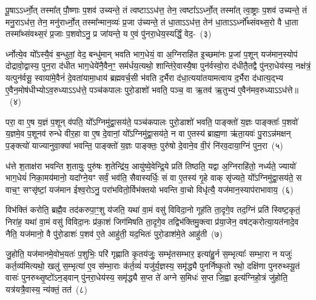 पू॒षा\-ऽ\-ऽर्ध्नो॒त् तस्मा᳚त् पौ॒ष्णाः प॒शव॑ उच्यन्ते॒ तं त्वष्टा\-ऽ\-ऽध॑त्त॒ तेन॒ त्वष्टा᳚\-ऽ\-ऽर्ध्नो॒त् तस्मा᳚त् त्वा॒ष्ट्राः प॒शव॑ उच्यन्ते॒ तं मनु॒रा\-ऽध॑त्त॒ तेन॒ मनु॑रार्ध्नो॒त् तस्मा᳚न्मान॒व्यः॑ प्र॒जा उ॑च्यन्ते॒ तं धा॒ता\-ऽ\-ऽध॑त्त॒ तेन॑ धा॒ता\-ऽ\-ऽर्ध्नो᳚थ्संवथ्स॒रो वै धा॒ता तस्मा᳚थ्संवथ्स॒रं प्र॒जाः प॒शवो\-ऽनु॒ प्र जा॑यन्ते॒ य ए॒वं पु॑नरा॒धेय॒स्यर्द्धिं॒ वेद॒-~(३)

र्ध्नोत्ये॒व यो᳚\-ऽस्यै॒वं ब॒न्धुतां॒ वेद॒ बन्धु॑मान् भवति भाग॒धेयं॒ वा अ॒ग्निराहि॑त इ॒च्छमा॑नः प्र॒जां प॒शून् यज॑मान॒स्योप॑ दोद्रावो॒द्वास्य॒ पुन॒रा द॑धीत भाग॒धेये॑नै॒वैन॒ꣳ॒ सम॑र्धय॒त्यथो॒ शान्ति॑रे॒वास्यै॒षा पुन॑र्वस्वो॒रा द॑धीतै॒तद्वै पु॑नरा॒धेय॑स्य॒ नक्ष॑त्रं॒ यत्पुन॑र्वसू॒ स्वाया॑मे॒वैनं॑ दे॒वता॑यामा॒धाय॑ ब्रह्मवर्च॒सी भ॑वति द॒र्भैरा द॑धा॒त्यया॑तयामत्वाय द॒र्भैरा द॑धात्य॒द्भ्य ए॒वैन॒मोष॑धीभ्यो\-ऽव॒रुध्या\-ऽ\-ऽध॑त्ते॒ पञ्च॑कपालः पुरो॒डाशो॑ भवति॒ पञ्च॒ वा ऋ॒तव॑ ऋ॒तुभ्य॑ ए॒वैन॑मव॒रुध्या\-ऽ\-ऽध॑त्ते॥~(४)

{\anuvakamend[{अशी॑यत॒ तत् तेन॒ वेद॑ द॒र्भैः पञ्च॑विꣳशतिश्च}]}%

परा॒ वा ए॒ष य॒ज्ञं प॒शून् व॑पति॒ यो᳚\-ऽग्निमु॑द्वा॒सय॑ते॒ पञ्च॑कपालः पुरो॒डाशो॑ भवति॒ पाङ्क्तो॑ य॒ज्ञः पाङ्क्ताः᳚ प॒शवो॑ य॒ज्ञमे॒व प॒शूनव॑ रुन्धे वीर॒हा वा ए॒ष दे॒वानां॒ यो᳚\-ऽग्निमु॑द्वा॒सय॑ते॒ न वा ए॒तस्य॑ ब्राह्म॒णा ऋ॑ता॒यवः॑ पु॒रा\-ऽन्न॑मक्षन् प॒ङ्क्त्यो॑ याज्यानुवा॒क्या॑ भवन्ति॒ पाङ्क्तो॑ य॒ज्ञः पाङ्क्तः॒ पुरु॑षो दे॒वाने॒व वी॒रं नि॑रव॒दाया॒ग्निं पुन॒रा~(५)

ध॑त्ते श॒ताक्ष॑रा भवन्ति श॒तायुः॒ पुरु॑षः श॒तेन्द्रि॑य॒ आयु॑ष्ये॒वेन्द्रि॒ये प्रति॑ तिष्ठति॒ यद्वा अ॒ग्निराहि॑तो॒ नर्ध्यते॒ ज्यायो॑ भाग॒धेयं॑ निका॒मय॑मानो॒ यदा᳚ग्ने॒यꣳ सर्वं॒ भव॑ति॒ सैवास्यर्धिः॒ सं वा ए॒तस्य॑ गृ॒हे वाक् सृ॑ज्यते॒ यो᳚\-ऽग्निमु॑द्वा॒सय॑ते॒ स वाच॒ꣳ॒ सꣳसृ॑ष्टां॒ यज॑मान ईश्व॒रो\-ऽनु॒ परा॑भवितो॒र्विभ॑क्तयो भवन्ति वा॒चो विधृ॑त्यै॒ यज॑मान॒स्याप॑राभावाय॒~(६)

विभ॑क्तिं करोति॒ ब्रह्मै॒व तद॑करुपा॒ꣳ॒शु य॑जति॒ यथा॑ वा॒मं वसु॑ विविदा॒नो गूह॑ति ता॒दृगे॒व तद॒ग्निं प्रति॑ स्विष्ट॒कृतं॒ निरा॑ह॒ यथा॑ वा॒मं वसु॑ विविदा॒नः प्र॑का॒शं जिग॑मिषति ता॒दृगे॒व तद्विभ॑क्तिमु॒क्त्वा प्र॑या॒जेन॒ वष॑ट्करोत्या॒यत॑नादे॒व नैति॒ यज॑मानो॒ वै पु॑रो॒डाशः॑ प॒शव॑ ए॒ते आहु॑ती॒ यद॒भितः॑ पुरो॒डाश॑मे॒ते आहु॑ती~(७)

जु॒होति॒ यज॑मानमे॒वोभ॒यतः॑ प॒शुभिः॒ परि॑ गृह्णाति कृ॒तय॑जुः॒ सम्भृ॑तसम्भार॒ इत्या॑हु॒र्न स॒म्भृत्याः᳚ सम्भा॒रा न यजुः॑ कर्त॒व्य॑मित्यथो॒ खलु॑ स॒म्भृत्या॑ ए॒व स॑म्भा॒राः क॑र्त॒व्यं॑ यजु॑र्य॒ज्ञस्य॒ समृ॑द्ध्यै पुनर्निष्कृ॒तो रथो॒ दक्षि॑णा पुनरुथ्स्यू॒तं वासः॑ पुनरुथ्सृ॒ष्टो॑\-ऽन॒ड्वान् पु॑नरा॒धेय॑स्य॒ समृ॑द्ध्यै स॒प्त ते॑ अग्ने स॒मिधः॑ स॒प्त जि॒ह्वा इत्य॑ग्निहो॒त्रं जु॑होति॒ यत्र॑यत्रै॒वास्य॒ न्य॑क्तं॒ तत॑~(८)

